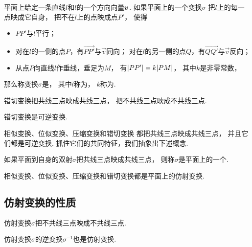 \begin{definition}
平面上给定一条直线\(l\)和\(l\)的一个方向向量\(\boldsymbol{v}\).
如果平面上的一个变换\(\sigma\)
把\(l\)上的每一点映成它自身，
把不在\(l\)上的点映成点\(P'\)，
使得\begin{itemize}
	\item \(PP'\)与\(l\)平行；
	\item 对在\(l\)的一侧的点\(P\)，有\(\vec{PP'}\)与\(\vec{v}\)同向；
	对在\(l\)的另一侧的点\(Q\)，有\(\vec{QQ'}\)与\(\vec{v}\)反向；
	\item 从点\(P\)向直线\(l\)作垂线，垂足为\(M\)，
	有\(\abs{PP'} = k \abs{PM}\)，
	其中\(k\)是非零常数，
\end{itemize}
那么称变换\(\sigma\)是，
其中\(l\)称为，
\(k\)称为.
\end{definition}

\begin{proposition}
错切变换把共线三点映成共线三点，
把不共线三点映成不共线三点.
\end{proposition}

\begin{proposition}
错切变换是可逆变换.
\end{proposition}

相似变换、位似变换、压缩变换和错切变换
都把共线三点映成共线三点，
并且它们都是可逆变换.
抓住它们的共同特征，我们抽象出下述概念.
\begin{definition}
如果平面到自身的双射\(\sigma\)把共线三点映成共线三点，
则称\(\sigma\)是平面上的一个.
\end{definition}

相似变换、位似变换、压缩变换和错切变换都是平面上的仿射变换.

\subsection{仿射变换的性质}
\begin{property}
仿射变换\(\sigma\)把不共线三点映成不共线三点.
\end{property}

\begin{property}
仿射变换\(\sigma\)的逆变换\(\sigma^{-1}\)也是仿射变换.
\end{property}


